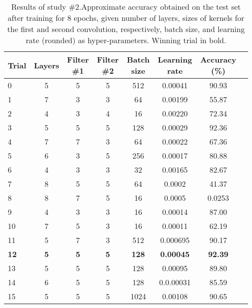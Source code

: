 \documentclass[british,12p]{article}
\begin{document}
	     \begin{table}
    \begin{tabular}{l||c|c|c|c|c|c||r}
  		Trial & Layers  & Filter \#1 & Filter \#2 & Batch size & Learning rate & Accuracy (\%) \\
  		\hline\hline
  		0 & 5 & 5 & 5 & 512 & 0.00041 & 90.93\\\hline
  		1 & 7 & 3 & 3 & 64 & 0.00199 & 55.87\\\hline
  		2 & 4 & 3 & 4 & 16 & 0.00220 & 72.34\\\hline
  		3 & 5 & 5 & 5 & 128 & 0.00029 & 92.36\\\hline
  		4 & 7 & 7 & 3 & 64 & 0.00022 & 67.36\\\hline
  		5 & 6 & 3 & 5 & 256 & 0.00017 & 80.88\\\hline
  		6 & 4 & 3 & 3 & 32 & 0.00165 & 82.67\\\hline
  		7 & 8 & 5 & 5 & 64 & 0.0002 & 41.37\\\hline
  		8 & 8 & 7 & 5 & 16 & 0.0005 & 0.0253\\\hline
  		9 & 4 & 3 & 3 & 16 & 0.00014 & 87.00\\\hline
  		10 & 7 & 5 & 3 & 16 & 0.00011 & 62.19\\\hline
  		11 & 5 & 7 & 3 & 512 & 0.000695 & 90.17\\\hline
  		\textbf{12} & \textbf{5} & \textbf{5} & \textbf{5} & \textbf{128} & \textbf{0.00045} & \textbf{92.39}\\\hline
  		13 & 5 & 5 & 5 & 128 & 0.00095 & 89.80\\\hline
  		14 & 6 & 5 & 5 & 128 & 0.0.00031 & 85.59 \\\hline
  		15 & 5 & 5 & 5 & 1024 & 0.00108 & 90.65
  		 
	\end{tabular}
	\caption{Results of study \#2.Approximate accuracy obtained on the test set after training for 8 epochs, given number of layers, sizes of kernels for the first and second convolution, respectively, batch size, and learning rate (rounded) as hyper-parameters. Winning trial in bold.}
	\label{tab-res2}
	 \end{table}
\end{document}
